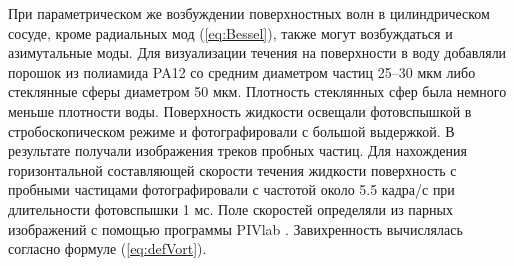 %
%
%
%
%
%
%
При параметрическом же возбуждении поверхностных волн в цилиндрическом сосуде, кроме радиальных мод (\ref{eq:Bessel}), также могут возбуждаться и азимутальные моды.
%
%
%
Для визуализации течения на поверхности в воду добавляли порошок из полиамида PA12 со средним диаметром частиц 25–30 мкм либо стеклянные сферы диаметром 50 мкм. Плотность стеклянных сфер была немного меньше плотности воды. Поверхность жидкости освещали фотовспышкой в стробоскопическом режиме и фотографировали с большой выдержкой. В результате получали изображения треков пробных частиц. Для нахождения горизонтальной составляющей скорости течения жидкости поверхность с пробными частицами фотографировали с частотой около 5.5 кадра/с при длительности фотовспышки 1 мс. Поле скоростей определяли из парных изображений с помощью программы PIVlab \cite{PIVlab, PIVlab1}. 
Завихренность вычислялась согласно формуле (\ref{eq:defVort}).
%


